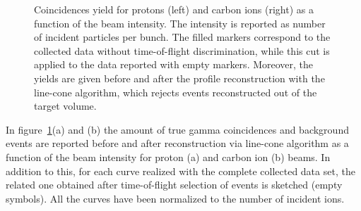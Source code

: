 \begin{figure} [!h]
  \caption{Coincidences yield for protons (left) and carbon ions (right) as a function of the beam intensity. The intensity is reported as number of incident particles per bunch. The filled markers correspond to the collected data without time-of-flight discrimination, while this cut is applied to the data reported with empty markers. Moreover, the yields are given before and after the profile reconstruction with the line-cone algorithm, which rejects events reconstructed out of the target volume.}
  \label{fig:coincidences}
\end{figure}

In figure~\ref{fig:coincidences}(a) and (b) the amount of true gamma coincidences and background events are reported before and after reconstruction via line-cone algorithm as a function of the beam intensity for proton (a) and carbon ion (b) beams. In addition to this, for each curve realized with the complete collected data set, the related one obtained after time-of-flight selection of events is sketched (empty symbols). All the curves have been normalized to the number of incident ions.

